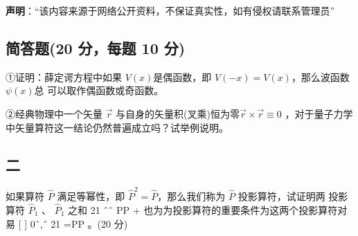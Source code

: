 
\textbf{声明}：“该内容来源于网络公开资料，不保证真实性，如有侵权请联系管理员”

\subsection{简答题(20 分，每题 10 分)}
①证明：薛定谔方程中如果 $V(x)$是偶函数，即 $V(-x)=V(x)$，那么波函数 $\psi(x)$总
可以取作偶函数或奇函数。

②经典物理中一个矢量 $\vec r$ 与自身的矢量积(叉乘)恒为零$\vec r \times \vec r\equiv
0$   ，对于量子力学
中矢量算符这一结论仍然普遍成立吗？试举例说明。

\subsection{二}
如果算符 $\hat{P}$ 满足等幂性，即 $\hat{P}^2 = \hat{P}$，那么我们称为 $\hat{P}$ 投影算符，试证明两
投影算符 $\hat{P}_1$ 、 $\hat{P}_1$ 之和 21 ˆˆ PP + 也为为投影算符的重要条件为这两个投影算符对易
[ ] 0ˆ,ˆ 21 =PP 。(20 分)